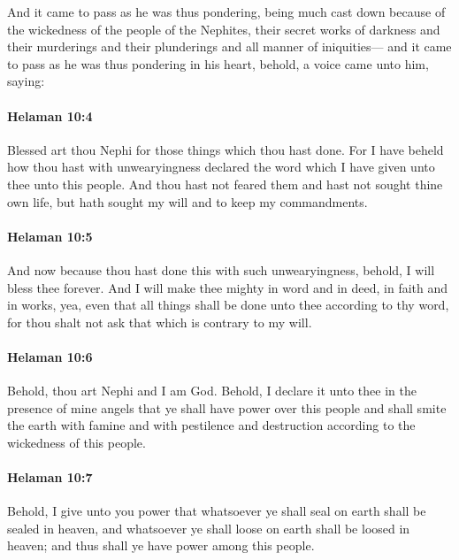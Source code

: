 			And it came to pass as he was thus pondering,
			being much cast down because of the wickedness of the people of the Nephites,
			their secret works of darkness
			and their murderings and their plunderings
			and all manner of iniquities---
			and it came to pass as he was thus pondering in his heart,
			behold, a voice came unto him, saying:

		\paragraph{Helaman 10:4} %
			\label{HELAMAN-10-4}

			Blessed art thou Nephi for those things which thou hast done.
			For I have beheld how thou hast with unwearyingness
			declared the word which I have given unto thee
			unto this people.
			And thou hast not feared them and hast not sought thine own life,
			but hath sought my will and to keep my commandments.

		\paragraph{Helaman 10:5} %
			\label{HELAMAN-10-5}

			And now because thou hast done this with such unwearyingness,
			behold, I will bless thee forever.
			And I will make thee mighty in word and in deed, in faith and in works,
			yea, even that all things shall be done unto thee according to thy word,
			for thou shalt not ask that which is contrary to my will.

		\paragraph{Helaman 10:6} %
			\label{HELAMAN-10-6}

			Behold, thou art Nephi and I am God.
			Behold, I declare it unto thee in the presence of mine angels
			that ye shall have power over this people
			and shall smite the earth with famine and with pestilence and destruction
			according to the wickedness of this people.

		\paragraph{Helaman 10:7} %
			\label{HELAMAN-10-7}

			Behold, I give unto you power
			that whatsoever ye shall seal on earth shall be sealed in heaven,
			and whatsoever ye shall loose on earth shall be loosed in heaven;
			and thus shall ye have power among this people.

